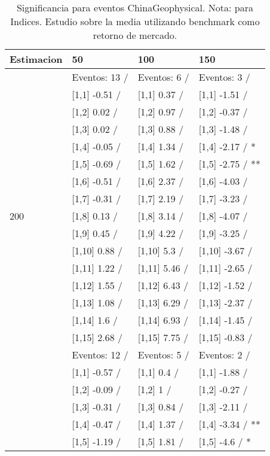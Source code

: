 \begin{table}

\caption{Significancia para eventos ChinaGeophysical. Nota: para Indices. Estudio sobre la media utilizando benchmark como retorno de mercado.}
\centering
\begin{tabular}[t]{llll}
\toprule
Estimacion & 50 & 100 & 150\\
\midrule
 & Eventos:  13 / & Eventos:  6 / & Eventos:  3 /\\
 & {}[1,1] -0.51  / & {}[1,1] 0.37  / & {}[1,1] -1.51  /\\
 & {}[1,2] 0.02  / & {}[1,2] 0.97  / & {}[1,2] -0.37  /\\
 & {}[1,3] 0.02  / & {}[1,3] 0.88  / & {}[1,3] -1.48  /\\
 & {}[1,4] -0.05  / & {}[1,4] 1.34  / & {}[1,4] -2.17  / *\\
\addlinespace
 & {}[1,5] -0.69  / & {}[1,5] 1.62  / & {}[1,5] -2.75  / **\\
 & {}[1,6] -0.51  / & {}[1,6] 2.37  / & {}[1,6] -4.03  /\\
 & {}[1,7] -0.31  / & {}[1,7] 2.19  / & {}[1,7] -3.23  /\\
200 & {}[1,8] 0.13  / & {}[1,8] 3.14  / & {}[1,8] -4.07  /\\
 & {}[1,9] 0.45  / & {}[1,9] 4.22  / & {}[1,9] -3.25  /\\
\addlinespace
 & {}[1,10] 0.88  / & {}[1,10] 5.3  / & {}[1,10] -3.67  /\\
 & {}[1,11] 1.22  / & {}[1,11] 5.46  / & {}[1,11] -2.65  /\\
 & {}[1,12] 1.55  / & {}[1,12] 6.43  / & {}[1,12] -1.52  /\\
 & {}[1,13] 1.08  / & {}[1,13] 6.29  / & {}[1,13] -2.37  /\\
 & {}[1,14] 1.6  / & {}[1,14] 6.93  / & {}[1,14] -1.45  /\\
\addlinespace
 & {}[1,15] 2.68  / & {}[1,15] 7.75  / & {}[1,15] -0.83  /\\
 & Eventos:  12 / & Eventos:  5 / & Eventos:  2 /\\
 & {}[1,1] -0.57  / & {}[1,1] 0.4  / & {}[1,1] -1.88  /\\
 & {}[1,2] -0.09  / & {}[1,2] 1  / & {}[1,2] -0.27  /\\
 & {}[1,3] -0.31  / & {}[1,3] 0.84  / & {}[1,3] -2.11  /\\
\addlinespace
 & {}[1,4] -0.47  / & {}[1,4] 1.37  / & {}[1,4] -3.34  / **\\
 & {}[1,5] -1.19  / & {}[1,5] 1.81  / & {}[1,5] -4.6  / *\\

\end{tabular}
\end{table}
